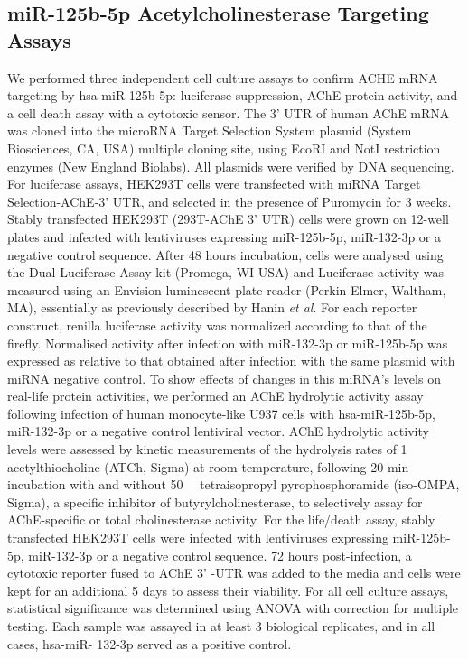 \begin{method}

\subsection{miR-125b-5p Acetylcholinesterase Targeting Assays}
We performed three independent cell culture assays to confirm ACHE mRNA targeting by hsa-miR-125b-5p: luciferase suppression, AChE protein activity, and a cell death assay with a cytotoxic sensor. The 3' UTR of human AChE mRNA\cite{Soreq1990} was cloned into the microRNA Target Selection System plasmid (System Biosciences, CA, USA) multiple cloning site, using EcoRI and NotI restriction enzymes (New England Biolabs). All plasmids were verified by DNA sequencing. For luciferase assays, HEK293T cells were transfected with miRNA Target Selection-AChE-3' UTR, and selected in the presence of Puromycin for 3 weeks. Stably transfected HEK293T (293T-AChE 3' UTR) cells were grown on 12-well plates and infected with lentiviruses expressing miR-125b-5p, miR-132-3p or a negative control sequence. After 48 hours incubation, cells were analysed using the Dual Luciferase Assay kit (Promega, WI USA) and Luciferase activity was measured using an Envision luminescent plate reader (Perkin-Elmer, Waltham, MA), essentially as previously described by Hanin \emph{et al}\cite{Hanin2014}. For each reporter construct, renilla luciferase activity was normalized according to that of the firefly. Normalised activity after infection with miR-132-3p or miR-125b-5p was expressed as relative to that obtained after infection with the same plasmid with miRNA negative control. To show effects of changes in this miRNA’s levels on real-life protein activities, we performed an AChE hydrolytic activity assay following infection of human monocyte-like U937 cells with hsa-miR-125b-5p, miR-132-3p or a negative control lentiviral vector. AChE hydrolytic activity levels were assessed by kinetic measurements of the hydrolysis rates of \SI{1}{\milli\Molar} acetylthiocholine (ATCh, Sigma) at room temperature, following 20 min incubation with and without \SI{50}{\micro\Molar} tetraisopropyl pyrophosphoramide (iso-OMPA, Sigma), a specific inhibitor of butyrylcholinesterase, to selectively assay for AChE-specific or total cholinesterase activity. For the life/death assay, stably transfected HEK293T cells were infected with lentiviruses expressing miR-125b-5p, miR-132-3p or a negative control sequence. 72 hours post-infection, a cytotoxic reporter fused to AChE 3' -UTR was added to the media and cells were kept for an additional 5 days to assess their viability. For all cell culture assays, statistical significance was determined using ANOVA with correction for multiple testing. Each sample was assayed in at least 3 biological replicates, and in all cases, hsa-miR- 132-3p served as a positive control.

\end{method}

